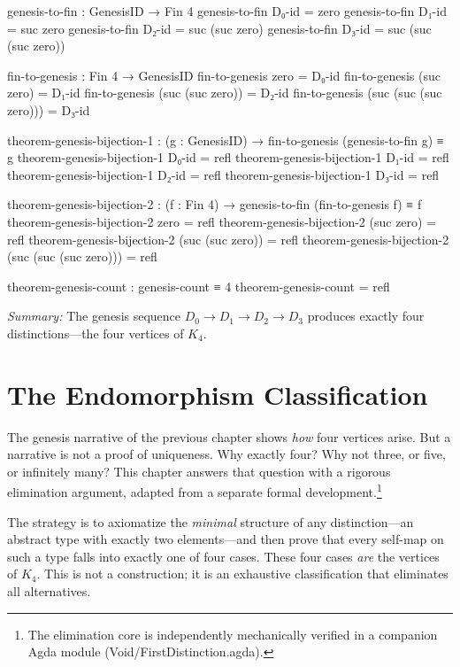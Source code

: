 \documentclass[11pt,a4paper]{book}
\def\texttt#1{#1}%
\begin{document}
\begin{code}
genesis-to-fin : GenesisID → Fin 4
genesis-to-fin D₀-id = zero
genesis-to-fin D₁-id = suc zero
genesis-to-fin D₂-id = suc (suc zero)
genesis-to-fin D₃-id = suc (suc (suc zero))

fin-to-genesis : Fin 4 → GenesisID
fin-to-genesis zero = D₀-id
fin-to-genesis (suc zero) = D₁-id
fin-to-genesis (suc (suc zero)) = D₂-id
fin-to-genesis (suc (suc (suc zero))) = D₃-id

theorem-genesis-bijection-1 : (g : GenesisID) → fin-to-genesis (genesis-to-fin g) ≡ g
theorem-genesis-bijection-1 D₀-id = refl
theorem-genesis-bijection-1 D₁-id = refl
theorem-genesis-bijection-1 D₂-id = refl
theorem-genesis-bijection-1 D₃-id = refl

theorem-genesis-bijection-2 : (f : Fin 4) → genesis-to-fin (fin-to-genesis f) ≡ f
theorem-genesis-bijection-2 zero = refl
theorem-genesis-bijection-2 (suc zero) = refl
theorem-genesis-bijection-2 (suc (suc zero)) = refl
theorem-genesis-bijection-2 (suc (suc (suc zero))) = refl

theorem-genesis-count : genesis-count ≡ 4
theorem-genesis-count = refl
\end{code}

\medskip
\noindent\textit{Summary:} The genesis sequence $D_0 \to D_1 \to D_2 \to D_3$ produces exactly 
four distinctions—the four vertices of $K_4$.

\chapter{The Endomorphism Classification}
\label{chap:endomorphism-classification}

The genesis narrative of the previous chapter shows \emph{how} four vertices arise.
But a narrative is not a proof of uniqueness. Why exactly four? Why not three, or five,
or infinitely many? This chapter answers that question with a rigorous elimination
argument, adapted from a separate formal development.\footnote{The elimination core
is independently mechanically verified in a companion Agda module
(\texttt{Void/FirstDistinction.agda}).}

The strategy is to axiomatize the \emph{minimal} structure of any distinction—an
abstract type with exactly two elements—and then prove that every self-map on such
a type falls into exactly one of four cases. These four cases \emph{are} the vertices
of $K_4$. This is not a construction; it is an exhaustive classification that eliminates
all alternatives.
\end{document}

